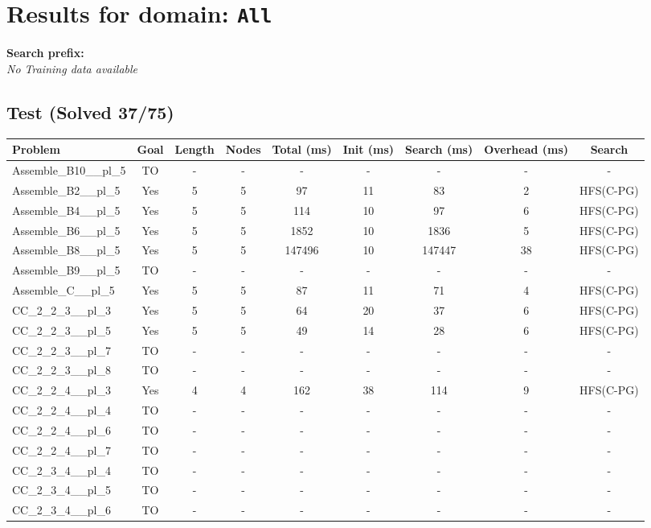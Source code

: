 \documentclass{article}
\begin{document}
\section*{Results for domain: \texttt{All}}
\textbf{Search prefix:} 
\\[0.5cm]
\textit{No Training data available}\\[0.5cm]
\subsection*{Test (Solved 37/75)}
\begin{tabular}{lcccccccc}
\toprule
Problem & Goal & Length & Nodes & Total (ms) & Init (ms) & Search (ms) & Overhead (ms) & Search \\
\midrule
Assemble\_B10\_\_pl\_5 & TO & - & - & - & - & - & - & - \\
Assemble\_B2\_\_pl\_5 & Yes & 5 & 5 & 97 & 11 & 83 & 2 & HFS(C-PG) \\
Assemble\_B4\_\_pl\_5 & Yes & 5 & 5 & 114 & 10 & 97 & 6 & HFS(C-PG) \\
Assemble\_B6\_\_pl\_5 & Yes & 5 & 5 & 1852 & 10 & 1836 & 5 & HFS(C-PG) \\
Assemble\_B8\_\_pl\_5 & Yes & 5 & 5 & 147496 & 10 & 147447 & 38 & HFS(C-PG) \\
Assemble\_B9\_\_pl\_5 & TO & - & - & - & - & - & - & - \\
Assemble\_C\_\_pl\_5 & Yes & 5 & 5 & 87 & 11 & 71 & 4 & HFS(C-PG) \\
CC\_2\_2\_3\_\_pl\_3 & Yes & 5 & 5 & 64 & 20 & 37 & 6 & HFS(C-PG) \\
CC\_2\_2\_3\_\_pl\_5 & Yes & 5 & 5 & 49 & 14 & 28 & 6 & HFS(C-PG) \\
CC\_2\_2\_3\_\_pl\_7 & TO & - & - & - & - & - & - & - \\
CC\_2\_2\_3\_\_pl\_8 & TO & - & - & - & - & - & - & - \\
CC\_2\_2\_4\_\_pl\_3 & Yes & 4 & 4 & 162 & 38 & 114 & 9 & HFS(C-PG) \\
CC\_2\_2\_4\_\_pl\_4 & TO & - & - & - & - & - & - & - \\
CC\_2\_2\_4\_\_pl\_6 & TO & - & - & - & - & - & - & - \\
CC\_2\_2\_4\_\_pl\_7 & TO & - & - & - & - & - & - & - \\
CC\_2\_3\_4\_\_pl\_4 & TO & - & - & - & - & - & - & - \\
CC\_2\_3\_4\_\_pl\_5 & TO & - & - & - & - & - & - & - \\
CC\_2\_3\_4\_\_pl\_6 & TO & - & - & - & - & - & - & - \\

\end{tabular}
\end{document}
